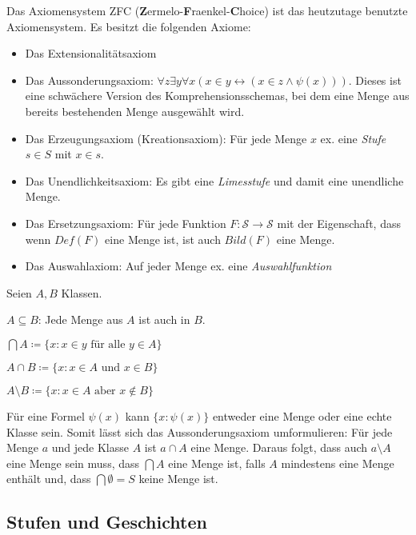 \begin{definition}
	Das Axiomensystem ZFC (\textbf{Z}ermelo-\textbf{F}raenkel-\textbf{C}hoice) ist das heutzutage benutzte Axiomensystem. Es besitzt die folgenden Axiome:
	\begin{itemize}
		\item Das Extensionalitätsaxiom
		\item Das Aussonderungsaxiom: $\forall z \exists y \forall x (x\in y \leftrightarrow(x\in z \land \psi(x)))$. Dieses ist eine schwächere Version des Komprehensionsschemas, bei dem eine Menge aus bereits bestehenden Menge ausgewählt wird.
		\item Das Erzeugungsaxiom (Kreationsaxiom): Für jede Menge $x$ ex. eine \textit{Stufe} $s\in S$ mit $x\in s$.
		\item Das Unendlichkeitsaxiom: Es gibt eine \textit{Limesstufe} und damit eine unendliche Menge.
		\item Das Ersetzungsaxiom: Für jede Funktion $F:\mathcal{S}\to \mathcal{S}$ mit der Eigenschaft, dass wenn $Def(F)$ eine Menge ist, ist auch $Bild(F)$ eine Menge.
		\item Das Auswahlaxiom: Auf jeder Menge ex. eine \textit{Auswahlfunktion}
	\end{itemize}
\end{definition}

\begin{definition}[Klassenoperatoren]
	Seien $A, B$ Klassen.
	
	$A \subseteq B$: Jede Menge aus $A$ ist auch in $B$.
	
	$\bigcap A\coloneqq\{x : x\in y \text{ für alle } y \in A\}$
	
	$A \cap B \coloneqq \{x : x\in A \text{ und } x \in B\}$
	
	$A \setminus B \coloneqq \{x : x \in A \text{ aber } x \notin B\}$
\end{definition}

Für eine Formel $\psi(x)$ kann $\{x : \psi(x)\}$ entweder eine Menge oder eine echte Klasse sein. Somit lässt sich das Aussonderungsaxiom umformulieren: Für jede Menge $a$ und jede Klasse $A$ ist $a \cap A$ eine Menge. Daraus folgt, dass auch $a \setminus A$ eine Menge sein muss, dass $\bigcap A$ eine Menge ist, falls $A$ mindestens eine Menge enthält und, dass $\bigcap \emptyset = S$ keine Menge ist.

\subsection{Stufen und Geschichten}

